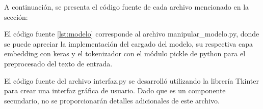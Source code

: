 A continuación, se presenta el código fuente de cada archivo mencionado en la sección:

El código fuente \ref{lst:modelo} corresponde al archivo manipular\_modelo.py, donde se puede apreciar la implementación del cargado del modelo, su respectiva capa embedding con keras y el tokenizador con el módulo pickle de python para el preprocesado del texto de entrada.




El código fuente del archivo interfaz.py se desarrolló utilizando la librería Tkinter para crear una interfaz gráfica de usuario. Dado que es un componente secundario, no se proporcionarán detalles adicionales de este archivo.